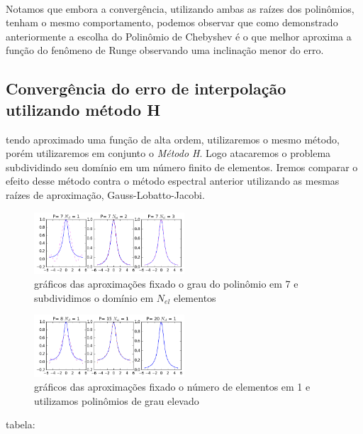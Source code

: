 \\
Notamos que embora a convergência, utilizando ambas as raízes dos polinômios, tenham o mesmo comportamento, podemos observar que como demonstrado  anteriormente a escolha do Polinômio de Chebyshev é o que melhor aproxima a função do fenômeno de Runge observando uma inclinação menor do erro.

\subsection{Convergência do erro de interpolação utilizando método H}
 tendo aproximado uma função de alta ordem, utilizaremos o mesmo método, porém utilizaremos em conjunto o \emph{Método H}. Logo atacaremos o problema subdividindo seu domínio em um número finito de elementos. Iremos comparar o efeito desse método contra o método espectral anterior utilizando as mesmas raízes de aproximação, Gauss-Lobatto-Jacobi.
\begin{figure}[!ht]
  \includegraphics[width=0.5\textwidth,center]{figuras/interp_usando_FEM.png}
  \caption{gráficos das aproximações fixado o grau do polinômio em 7 e subdividimos o domínio em $N_{el}$ elementos }
\end{figure}
\begin{figure}[!hb]
  \includegraphics[width=0.5\textwidth,center]{figuras/interp_usando_FEMfixo.png}
  \caption{gráficos das aproximações fixado o número de elementos em 1 e utilizamos polinômios de grau elevado}
\end{figure}
tabela:
